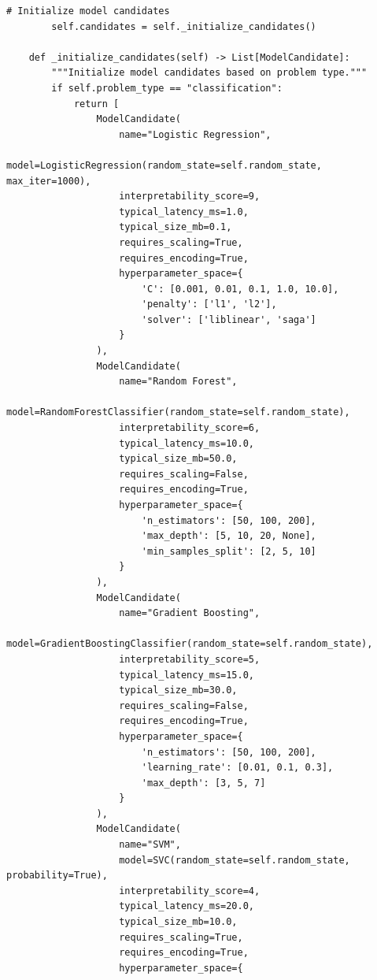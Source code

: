 \begin{lstlisting}[style=python, caption={Automated Model Selection Framework}]
        # Initialize model candidates
        self.candidates = self._initialize_candidates()

    def _initialize_candidates(self) -> List[ModelCandidate]:
        """Initialize model candidates based on problem type."""
        if self.problem_type == "classification":
            return [
                ModelCandidate(
                    name="Logistic Regression",
                    model=LogisticRegression(random_state=self.random_state, max_iter=1000),
                    interpretability_score=9,
                    typical_latency_ms=1.0,
                    typical_size_mb=0.1,
                    requires_scaling=True,
                    requires_encoding=True,
                    hyperparameter_space={
                        'C': [0.001, 0.01, 0.1, 1.0, 10.0],
                        'penalty': ['l1', 'l2'],
                        'solver': ['liblinear', 'saga']
                    }
                ),
                ModelCandidate(
                    name="Random Forest",
                    model=RandomForestClassifier(random_state=self.random_state),
                    interpretability_score=6,
                    typical_latency_ms=10.0,
                    typical_size_mb=50.0,
                    requires_scaling=False,
                    requires_encoding=True,
                    hyperparameter_space={
                        'n_estimators': [50, 100, 200],
                        'max_depth': [5, 10, 20, None],
                        'min_samples_split': [2, 5, 10]
                    }
                ),
                ModelCandidate(
                    name="Gradient Boosting",
                    model=GradientBoostingClassifier(random_state=self.random_state),
                    interpretability_score=5,
                    typical_latency_ms=15.0,
                    typical_size_mb=30.0,
                    requires_scaling=False,
                    requires_encoding=True,
                    hyperparameter_space={
                        'n_estimators': [50, 100, 200],
                        'learning_rate': [0.01, 0.1, 0.3],
                        'max_depth': [3, 5, 7]
                    }
                ),
                ModelCandidate(
                    name="SVM",
                    model=SVC(random_state=self.random_state, probability=True),
                    interpretability_score=4,
                    typical_latency_ms=20.0,
                    typical_size_mb=10.0,
                    requires_scaling=True,
                    requires_encoding=True,
                    hyperparameter_space={

\end{lstlisting}
